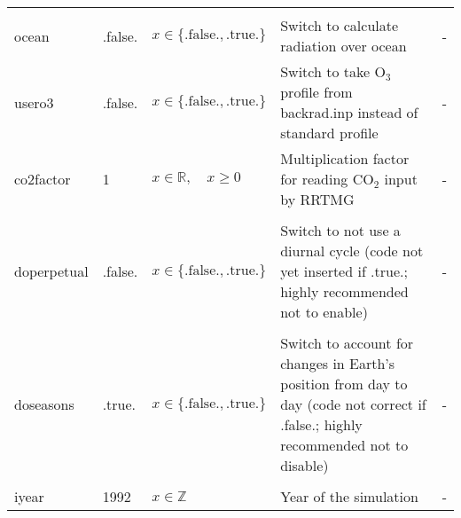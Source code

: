 \documentclass[twoside,11pt,fleqn,a4paper,english,openright]{report}
\begin{document}
\begin{center}
\begin{supertabular}{|l|p{2cm}|p{4cm}|p{6cm}|l|}
 &&&&\\
 ocean		& .false.	& $x\in\{\text{.false.},\text{.true.}\}$	& Switch to calculate radiation over ocean	& -\\
 usero3		& .false.	& $x\in\{\text{.false.},\text{.true.}\}$	& Switch to take O$_3$ profile from backrad.inp instead of standard profile	& -\\
 co2factor	& 1			& $x \in \mathbb{R},\quad x \geq 0$			& Multiplication factor for reading CO$_2$ input by RRTMG	& - \\
 &&&&\\
 doperpetual	& .false.	& $x\in\{\text{.false.},\text{.true.}\}$	& \parbox{6cm}{Switch to not use a diurnal cycle	(code not yet inserted if .true.; highly recommended not to enable)}& -\\
  &&&&\\
 doseasons	& .true.	& $x\in\{\text{.false.},\text{.true.}\}$	& \parbox{6cm}{Switch to account for changes in Earth's position from day to day (code not correct if .false.; highly recommended not to disable)} & -\\
  &&&&\\
 iyear	& 1992			& $x\in\mathbb{Z}$	& Year of the simulation & -\\
\end{supertabular}
\end{center}

\newpage
\end{document}
